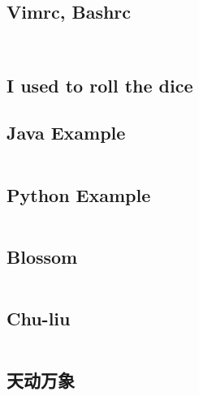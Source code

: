 \documentclass[titlepage, a4paper]{article}
\begin{document}
\begin{multicols}{2}
\begin{spacing}{0.6}
				\subsection{Vimrc, Bashrc}
				\inputminted{vim}{src/Miscellany/vimrc}
				\inputminted{sh}{src/Miscellany/bashrc}
				\subsection{I used to roll the dice}
				\texttt{}
				\newpage
			\subsection*{Java Example}
				\inputminted{java}{src/Miscellany/Main2.java}
			\subsection*{Python Example}
				\inputminted{python}{src/Miscellany/test.py}
			\subsection*{Blossom}
				\inputminted{python}{src/TreeandGraph/Blossom.cpp}
			\subsection*{Chu-liu}
				\inputminted{cpp}{src/TreeandGraph/最小树形图.cpp}
			\subsection*{天动万象}
				\inputminted{cpp}{src/yzh/ByteCampA3.cpp}
		\end{spacing}
		\endgroup
	\end{multicols}
	
\end{document}
